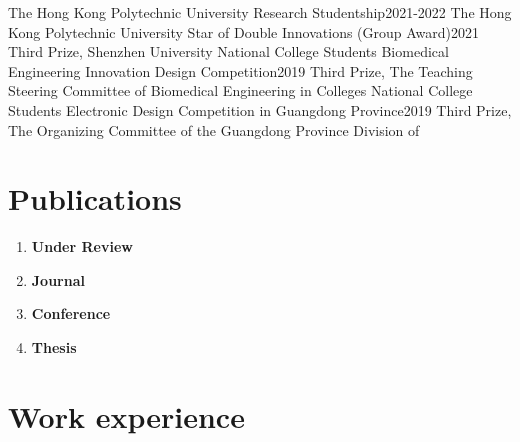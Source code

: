 \documentclass[letterpaper,11pt]{article}
\begin{document}
    \resumeSubHeadingListStart
        \resumeSubheading
            {The Hong Kong Polytechnic University Research Studentship}{2021-2022}
            {The Hong Kong Polytechnic University}{}
        \resumeSubheading
            {Star of Double Innovations (Group Award)}{2021}
            {Third Prize, Shenzhen University}{}
        \resumeSubheading
            {National College Students Biomedical Engineering Innovation Design Competition}{2019}
            {Third Prize, The Teaching Steering Committee of Biomedical Engineering in Colleges}{}
        \resumeSubheading
            {National College Students Electronic Design Competition in Guangdong Province}{2019}
            {Third Prize, The Organizing Committee of the Guangdong Province Division of }{}
    \resumeSubHeadingListEnd

    \section{Publications}
    
    \begin{refsection}
        \begin{enumerate}[leftmargin=0.15in, label={}, itemsep=0em]
            \item \textbf{Under Review}
            \nocite{*}
            \printbibliography[keyword=review, heading=none]
            \item \textbf{Journal}
            \nocite{*}
            \printbibliography[type=article, notkeyword=review, heading=none]
            \item \textbf{Conference}
            \nocite{*}
            \printbibliography[type=inproceedings, notkeyword=review, heading=none]
            \item \textbf{Thesis}
            \nocite{*}
            \printbibliography[type=thesis, notkeyword=review, heading=none]
            \printbibliography[type=phdthesis, notkeyword=review, heading=none]
        \end{enumerate}
    \end{refsection}

    \section{Work experience}
\end{document}

